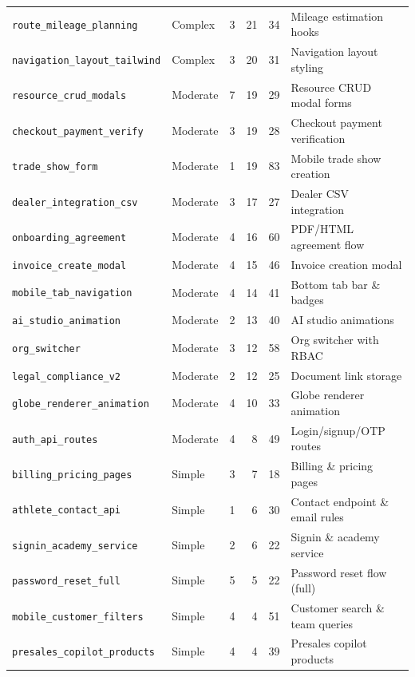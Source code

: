 \documentclass[11pt,a4paper]{article}
\begin{document}
\begin{table}[H]
\begin{tabular}{llrrrl}
\texttt{route\_mileage\_planning}  & Complex  & 3 & 21 & 34  & Mileage estimation hooks \\
\texttt{navigation\_layout\_tailwind}& Complex& 3 & 20 & 31  & Navigation layout styling \\
\midrule
\texttt{resource\_crud\_modals}    & Moderate & 7 & 19 & 29  & Resource CRUD modal forms \\
\texttt{checkout\_payment\_verify} & Moderate & 3 & 19 & 28  & Checkout payment verification \\
\texttt{trade\_show\_form}         & Moderate & 1 & 19 & 83  & Mobile trade show creation \\
\texttt{dealer\_integration\_csv}  & Moderate & 3 & 17 & 27  & Dealer CSV integration \\
\texttt{onboarding\_agreement}     & Moderate & 4 & 16 & 60  & PDF/HTML agreement flow \\
\texttt{invoice\_create\_modal}    & Moderate & 4 & 15 & 46  & Invoice creation modal \\
\texttt{mobile\_tab\_navigation}   & Moderate & 4 & 14 & 41  & Bottom tab bar \& badges \\
\texttt{ai\_studio\_animation}     & Moderate & 2 & 13 & 40  & AI studio animations \\
\texttt{org\_switcher}             & Moderate & 3 & 12 & 58  & Org switcher with RBAC \\
\texttt{legal\_compliance\_v2}     & Moderate & 2 & 12 & 25  & Document link storage \\
\texttt{globe\_renderer\_animation}& Moderate & 4 & 10 & 33  & Globe renderer animation \\
\texttt{auth\_api\_routes}         & Moderate & 4 &  8 & 49  & Login/signup/OTP routes \\
\midrule
\texttt{billing\_pricing\_pages}   & Simple   & 3 &  7 & 18  & Billing \& pricing pages \\
\texttt{athlete\_contact\_api}     & Simple   & 1 &  6 & 30  & Contact endpoint \& email rules \\
\texttt{signin\_academy\_service}  & Simple   & 2 &  6 & 22  & Signin \& academy service \\
\texttt{password\_reset\_full}     & Simple   & 5 &  5 & 22  & Password reset flow (full) \\
\texttt{mobile\_customer\_filters} & Simple   & 4 &  4 & 51  & Customer search \& team queries \\
\texttt{presales\_copilot\_products}& Simple  & 4 &  4 & 39  & Presales copilot products \\

\end{tabular}
\end{table}
\end{document}
